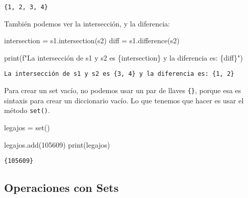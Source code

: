 \documentclass[
  letterpaper,
  DIV=11,
  numbers=noendperiod]{scrreprt}
\newenvironment{Shaded}{\begin{snugshade}}{\end{snugshade}}
\newcommand{\BuiltInTok}[1]{\textcolor[rgb]{0.00,0.23,0.31}{#1}}
\newcommand{\DecValTok}[1]{\textcolor[rgb]{0.68,0.00,0.00}{#1}}
\newcommand{\NormalTok}[1]{\textcolor[rgb]{0.00,0.23,0.31}{#1}}
\newcommand{\OperatorTok}[1]{\textcolor[rgb]{0.37,0.37,0.37}{#1}}
\newcommand{\SpecialCharTok}[1]{\textcolor[rgb]{0.37,0.37,0.37}{#1}}
\newcommand{\SpecialStringTok}[1]{\textcolor[rgb]{0.13,0.47,0.30}{#1}}
\begin{document}
\begin{verbatim}
{1, 2, 3, 4}
\end{verbatim}

También podemos ver la intersección, y la diferencia:

\begin{Shaded}
\begin{Highlighting}[]
\NormalTok{intersection }\OperatorTok{=}\NormalTok{ s1.intersection(s2)}
\NormalTok{diff }\OperatorTok{=}\NormalTok{ s1.difference(s2)}

\BuiltInTok{print}\NormalTok{(}\SpecialStringTok{f"La intersección de s1 y s2 es }\SpecialCharTok{\{}\NormalTok{intersection}\SpecialCharTok{\}}\SpecialStringTok{ y la diferencia es: }\SpecialCharTok{\{}\NormalTok{diff}\SpecialCharTok{\}}\SpecialStringTok{"}\NormalTok{)}
\end{Highlighting}
\end{Shaded}

\begin{verbatim}
La intersección de s1 y s2 es {3, 4} y la diferencia es: {1, 2}
\end{verbatim}

Para crear un set vacío, no podemos usar un par de llaves \texttt{\{\}},
porque esa es sintaxis para crear un diccionario vacío. Lo que tenemos
que hacer es usar el método \texttt{set()}.

\begin{Shaded}
\begin{Highlighting}[]
\NormalTok{legajos }\OperatorTok{=} \BuiltInTok{set}\NormalTok{()}

\NormalTok{legajos.add(}\DecValTok{105609}\NormalTok{)}
\BuiltInTok{print}\NormalTok{(legajos)}
\end{Highlighting}
\end{Shaded}

\begin{verbatim}
{105609}
\end{verbatim}

\subsection{Operaciones con Sets}\label{operaciones-con-sets}
\end{document}
